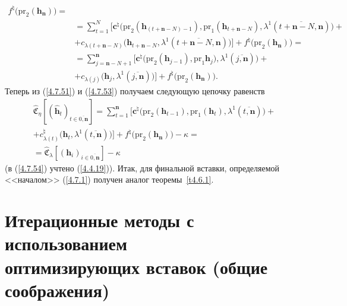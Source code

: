 \documentclass[11pt,twoside,openany]{report}
\newcommand{\ov}{\overline}
\newcommand{\la}{\lambda}
\newcommand{\zc}{{\mathbf c}}
\newcommand{\nn}{{\mathbf n}}
\begin{document}
{{\begin{eqnarray}
f^\natural\bigl(\mathrm{pr}_2(\mathbf{h}_\nn)\bigl)=
&\nonumber\\
&= \sum\limits_{t=1}^N\bigl[\zc^\natural\bigl(\mathrm{pr}_2(\mathbf{h}_{(t+\nn-N)-1}),\mathrm{pr}_1
(\mathbf{h}_{t+\nn-N}),\la^1(\ov{t+\nn-N,\nn})\bigl)+
&\nonumber\\
&+c_{\la(t+\nn-N)}\bigl(\mathbf{h}_{t+\nn-N},\la^1(\ov{t+\nn-N,\nn})\bigl)\bigl]+
f^\natural\bigl(\mathrm{pr}_2(\mathbf{h}_\nn)\bigl)=
&\nonumber\\
&= \sum\limits_{j=\nn-N+1}^\nn\bigl[\zc^\natural\bigl(\mathrm{pr}_2(\mathbf{h}_{j-1}),\mathrm{pr}_1
\mathbf{h}_j),\la^1(\ov{j,\nn})\bigl) +
&\nonumber\\
&+c_{\la(j)}\bigl(\mathbf{h}_j,\la^1(\ov{j,\nn})\bigl)\bigl]+
f^\natural\bigl(\mathrm{pr}_2(\mathbf{h}_\nn)\bigl).
&\label{4.7.53}
\end{eqnarray}
Теперь из (\ref{4.7.51}) и (\ref{4.7.53}) получаем следующую цепочку равенств
\begin{eqnarray}
&\widehat{\mathfrak{C}}_\eta[(\hat{\mathbf{h}}_t)_{t\in\ov{0,\nn}}] =
\sum\limits_{t=1}^\nn\bigl[\zc^\natural\bigl(\mathrm{pr}_2(\mathbf{h}_{t-1}),\mathrm{pr}_1
(\mathbf{h}_t),\la^1(\ov{t,\nn})\bigl) +
&\nonumber\\
&+c_{\la(t)}^\natural\bigl(\mathbf{h}_t,
\la^1(\ov{t,\nn})\bigl)\bigl]+ f^\natural\bigl(\mathrm{pr}_2(\mathbf{h}_\nn)\bigl)- \kappa =
&\nonumber\\
&=\widehat{\mathfrak{C}}_\la[(\mathbf{h}_i)_{i\in\ov{0,\nn}}]-\kappa
&\label{4.7.54}
\end{eqnarray}
(в (\ref{4.7.54}) учтено (\ref{4.4.19})). Итак,   для финальной вставки, определяемой <<началом>>
(\ref{4.7.1}) получен аналог теоремы~\ref{t4.6.1}.

\section{Итерационные методы с использованием\\ оптимизирующих вставок (общие соображения)}
\setcounter{equation}{-1}

}}
\end{document}
